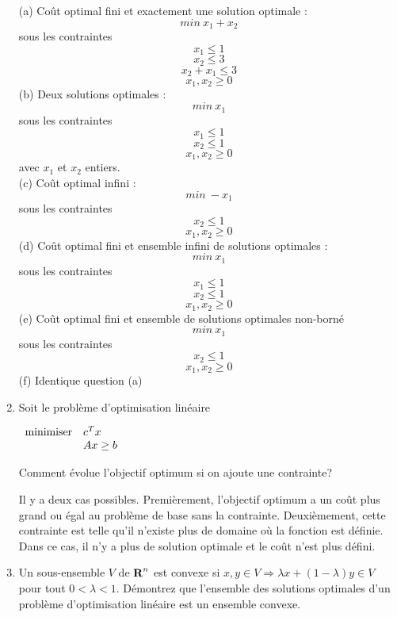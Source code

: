 \begin{enumerate}
\begin{enumerate}
    \end{enumerate}

    \begin{solution}
      (a) Coût optimal fini et exactement une solution optimale : 
      $$ min~x_{1} + x_{2}$$
      sous les contraintes 
      $$ x_{1} \le 1$$
      $$ x_{2} \le 3$$
      $$ x_{2} + x_{1} \le 3 $$
      $$ x_{1}, x_{2} \geq 0$$
      (b) Deux solutions optimales : 
      $$ min ~x_{1}$$
      sous les contraintes
      $$ x_{1} \le 1$$
      $$ x_{2} \le 1$$
      $$ x_{1}, x_{2} \geq 0$$
      avec $ x_{1}$ et $x_{2}$ entiers. \\
      \newline
      (c) Coût optimal infini : 
      $$ min ~ -x_{1} $$ 
      sous les contraintes
      $$ x_{2} \le 1 $$ 
      $$ x_{1}, x_{2} \geq 0$$
      (d) Coût optimal fini et ensemble infini de solutions optimales : 
      $$ min ~x_{1}$$
      sous les contraintes
      $$ x_{1} \le 1$$
      $$ x_{2} \le 1$$
      $$ x_{1}, x_{2} \geq 0$$
      (e) Coût optimal fini et ensemble de solutions optimales non-borné
      $$ min ~ x_{1} $$ 
      sous les contraintes
      $$ x_{2} \le 1 $$ 
      $$ x_{1}, x_{2} \geq 0$$
      (f) Identique question (a)

    \end{solution}

  \item Soit le problème d'optimisation linéaire

    $
    \begin{array}{ll}
      \mbox{minimiser} &  c^T x \\
      \mbox{ }
      & A x \geq b
    \end{array}
    $

    Comment évolue l'objectif optimum si on ajoute une contrainte?

    \begin{solution}

      Il y a deux cas possibles. Premièrement, l'objectif optimum a un coût plus grand ou égal au problème de base sans la contrainte. Deuxièmement, cette contrainte est telle qu'il n'existe plus de domaine où la fonction est définie. Dans ce cas, il n'y a plus de solution optimale et le coût n'est plus défini. 

    \end{solution}

  \item Un sous-ensemble $V$ de ${\mbox{\bf R}}^n$ est convexe si $x, y \in V \Rightarrow \lambda x + (1-\lambda) y \in V$ pour tout $0 < \lambda <1$. Démontrez que
    l'ensemble des solutions optimales d'un problème d'optimisation linéaire est un ensemble convexe.


\end{enumerate}
